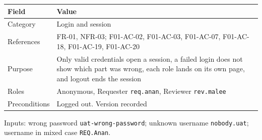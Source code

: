 {\def\LTcaptype{none} %
\begin{longtable}[]{@{}
  >{\raggedright\arraybackslash}p{}
  >{\raggedright\arraybackslash}p{}@{}}
\toprule\noalign{}
\begin{minipage}[b]{\linewidth}\raggedright
Field
\end{minipage} & \begin{minipage}[b]{\linewidth}\raggedright
Value
\end{minipage} \\
\midrule\noalign{}
\endhead
\bottomrule\noalign{}
\endlastfoot
Category & Login and session \\
References & FR-01, NFR-03; F01-AC-02, F01-AC-03, F01-AC-07, F01-AC-18, F01-AC-19, F01-AC-20 \\
Purpose & Only valid credentials open a session, a failed login does not show which part was wrong, each role lands on its own page, and logout ends the session \\
Roles & Anonymous, Requester \texttt{req.anan}, Reviewer \texttt{rev.malee} \\
Preconditions & Logged out. Version recorded \\
\end{longtable}
}

Inputs: wrong password \texttt{uat-wrong-password}; unknown username \texttt{nobody.uat}; username in mixed case \texttt{REQ.Anan}.

